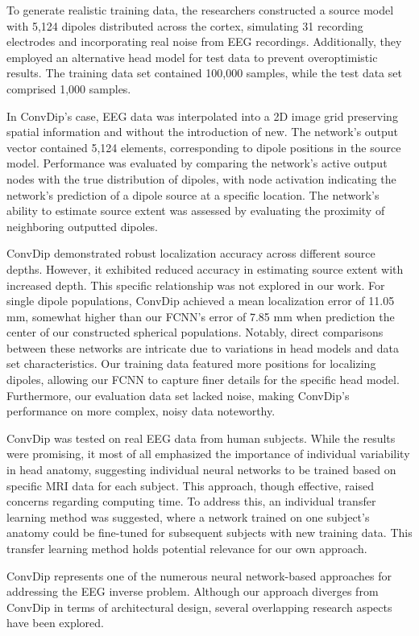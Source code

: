 \documentclass[a4paper, UKenglish, 11pt]{uiomaster}
\begin{document}
To generate realistic training data, the researchers constructed a source model with 5,124 dipoles distributed across the cortex, simulating 31 recording electrodes and incorporating real noise from EEG recordings. Additionally, they employed an alternative head model for test data to prevent overoptimistic results. The training data set contained 100,000 samples, while the test data set comprised 1,000 samples.

In ConvDip's case, EEG data was interpolated into a 2D image grid preserving spatial information and without the introduction of new. The network's output vector contained 5,124 elements, corresponding to dipole positions in the source model. Performance was evaluated by comparing the network's active output nodes with the true distribution of dipoles, with node activation indicating the network's prediction of a dipole source at a specific location. The network's ability to estimate source extent was assessed by evaluating the proximity of neighboring outputted dipoles.

ConvDip demonstrated robust localization accuracy across different source depths. However, it exhibited reduced accuracy in estimating source extent with increased depth. This specific relationship was not explored in our work. For single dipole populations, ConvDip achieved a mean localization error of 11.05 mm, somewhat higher than our FCNN's error of 7.85 mm when prediction the center of our constructed spherical populations. Notably, direct comparisons between these networks are intricate due to variations in head models and data set characteristics. Our training data featured more positions for localizing dipoles, allowing our FCNN to capture finer details for the specific head model. Furthermore, our evaluation data set lacked noise, making ConvDip's performance on more complex, noisy data noteworthy.

ConvDip was tested on real EEG data from human subjects. While the results were promising, it most of all emphasized the importance of individual variability in head anatomy, suggesting individual neural networks to be trained based on specific MRI data for each subject. This approach, though effective, raised concerns regarding computing time. To address this, an individual transfer learning method was suggested, where a network trained on one subject's anatomy could be fine-tuned for subsequent subjects with new training data. This transfer learning method holds potential relevance for our own approach.

ConvDip represents one of the numerous neural network-based approaches for addressing the EEG inverse problem. Although our approach diverges from ConvDip in terms of architectural design, several overlapping research aspects have been explored.
\end{document}
